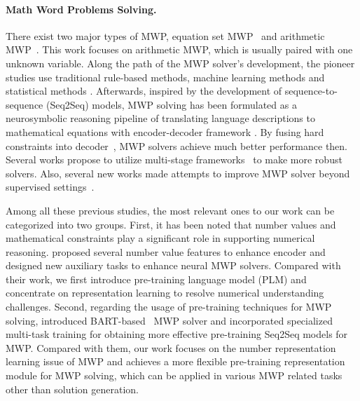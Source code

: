 \documentclass[11pt]{article}
\begin{document}
\paragraph{Math Word Problems Solving.}
There exist  two major types of MWP, equation set MWP~\cite{wang2017deep,zhao2020ape210k} and arithmetic MWP~\cite{DBLP:conf/emnlp/QinLLZL20,huang2016well}. This work focuses on arithmetic MWP, which is usually paired with one unknown variable.
Along the path of the MWP solver's development, the pioneer studies use traditional rule-based methods, machine learning methods and statistical methods \cite{yuhui2010frame,kushman2014learning,shi2015automatically,koncel2015parsing}.
Afterwards, inspired by the development of sequence-to-sequence (Seq2Seq) models, MWP solving has been formulated as a neurosymbolic reasoning pipeline of translating language descriptions to mathematical equations with encoder-decoder framework \cite{wang2018translating,wang2019template,li2019modeling,zhang2020graph,yu2021improving,wu2021edge}. By fusing hard constraints into decoder~\cite{DBLP:conf/naacl/Chiang2019,liu2019tree,xie2019goal,shen2020solving,ijcai2020-555}, MWP solvers achieve much better performance then. Several works propose to utilize multi-stage frameworks~\cite{wang2019template,huang2021recall,DBLP:conf/emnlp/ShenYLSJ0021,ijcai2021} to make more robust solvers. Also, several new works made attempts to improve MWP solver beyond supervised settings~\cite{hong2021weakly,hong2021smart}. 

Among all these previous studies, the most relevant ones to our work can be categorized into two groups. First, it has been noted that number values and mathematical constraints play a significant role in supporting numerical reasoning. \citet{wu2021math} proposed several number value features to enhance encoder and \citet{qin2021neural} designed new auxiliary tasks to enhance neural MWP solvers. Compared with their work, we first introduce pre-training language model (PLM) and concentrate on representation learning to resolve numerical understanding challenges. Second, regarding the usage of  pre-training techniques for MWP solving,  \citet{DBLP:conf/emnlp/ShenYLSJ0021} introduced BART-based~\cite{DBLP:conf/acl/LewisLGGMLSZ20} MWP solver and incorporated specialized multi-task training for obtaining more effective pre-training Seq2Seq models for MWP. Compared with them, our work focuses on the number representation learning issue of MWP and achieves a more flexible pre-training representation module for MWP solving, which can be applied in various MWP related tasks other than solution generation. 
\end{document}
